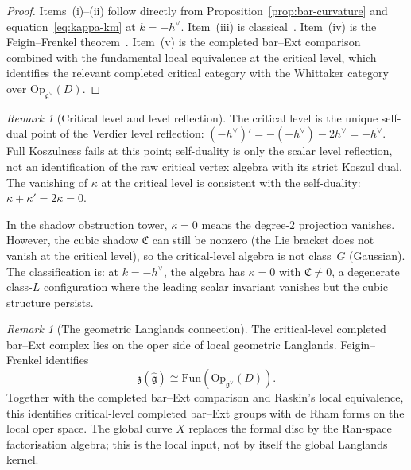 \documentclass[11pt]{article}
\theoremstyle{plain}
\theoremstyle{definition}
\theoremstyle{remark}
\newtheorem{remark}[theorem]{Remark}
\newcommand{\fg}{\mathfrak{g}}
\numberwithin{equation}{section}
\begin{document}
\begin{proof}
Items~(i)--(ii) follow directly from
Proposition~\ref{prop:bar-curvature} and
equation~\eqref{eq:kappa-km} at $k = -h^\vee$.
Item~(iii) is classical~\cite{FF92}.
Item~(iv) is the Feigin--Frenkel theorem~\cite{FF92}.
Item~(v) is the completed bar--Ext comparison combined with the
fundamental local equivalence at the critical level, which identifies
the relevant completed critical category with the Whittaker category
over \(\mathrm{Op}_{\fg^\vee}(D)\).
\end{proof}

\begin{remark}[Critical level and level reflection]
\label{rem:critical-self-dual}
The critical level is the unique self-dual point of
the Verdier level reflection:
$(-h^\vee)' = -(-h^\vee) - 2h^\vee = -h^\vee$.
Full Koszulness fails at this point; self-duality is only the scalar
level reflection, not an identification of the raw critical vertex
algebra with its strict Koszul dual.
The vanishing of $\kappa$ at the critical level is
consistent with the self-duality:
$\kappa + \kappa' = 2\kappa = 0$.

In the shadow obstruction tower, $\kappa = 0$ means the
degree-$2$ projection vanishes. However, the cubic
shadow $\mathfrak{C}$ can still be nonzero (the Lie
bracket does not vanish at the critical level), so
the critical-level algebra is not class~$G$
(Gaussian). The classification is: at $k = -h^\vee$,
the algebra has $\kappa = 0$ with $\mathfrak{C} \neq 0$,
a degenerate class-$L$ configuration where the leading
scalar invariant vanishes but the cubic structure
persists.
\end{remark}

\begin{remark}[The geometric Langlands connection]
\label{rem:langlands}
The critical-level completed bar--Ext complex lies on the oper side of
local geometric Langlands. Feigin--Frenkel identifies
\[
\mathfrak z(\widehat{\fg})\cong \mathrm{Fun}(\mathrm{Op}_{\fg^\vee}(D)).
\]
Together with the completed bar--Ext comparison and Raskin's local
equivalence, this identifies critical-level completed bar--Ext groups
with de Rham forms on the local oper space. The global curve \(X\)
replaces the formal disc by the Ran-space factorisation algebra; this
is the local input, not by itself the global Langlands kernel.
\end{remark}

\end{document}
